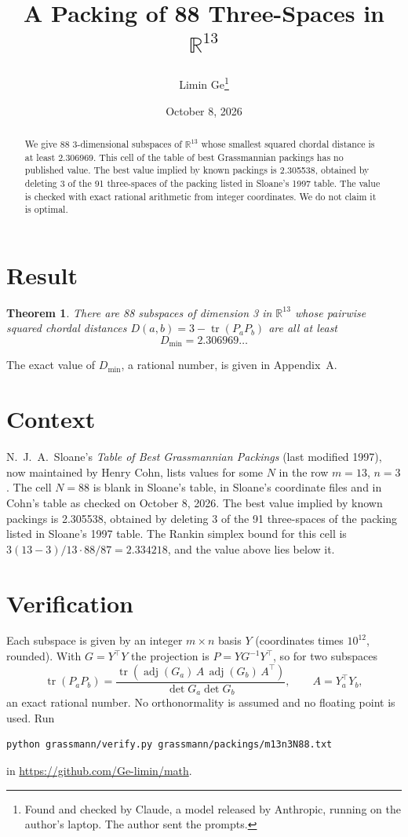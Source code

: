 \documentclass[11pt,a4paper]{article}
\title{A Packing of 88 Three-Spaces in $\mathbb{R}^{13}$}
\author{Limin Ge\thanks{Found and checked by Claude, a model released by Anthropic, running on the author's laptop. The author sent the prompts.}}
\date{October 8, 2026}
\newtheorem*{theorem}{Theorem}
\begin{document}
\maketitle
\begin{abstract}
We give 88 3-dimensional subspaces of $\mathbb{R}^{13}$ whose smallest squared chordal distance is at least 2.306969. This cell of the table of best Grassmannian packings has no published value. The best value implied by known packings is 2.305538, obtained by deleting 3 of the 91 three-spaces of the packing listed in Sloane's 1997 table. The value is checked with exact rational arithmetic from integer coordinates. We do not claim it is optimal.
\end{abstract}

\section{Result}
\begin{theorem}
There are 88 subspaces of dimension 3 in $\mathbb{R}^{13}$ whose pairwise squared chordal distances $D(a,b) = 3 - \operatorname{tr}(P_aP_b)$ are all at least
\[ D_{\min} = 2.306969\ldots \]
\end{theorem}
The exact value of $D_{\min}$, a rational number, is given in Appendix~A.


\section{Context}
N.~J.~A.~Sloane's \emph{Table of Best Grassmannian Packings} (last modified 1997), now maintained by Henry Cohn, lists values for some $N$ in the row $m=13$, $n=3$. The cell $N=88$ is blank in Sloane's table, in Sloane's coordinate files and in Cohn's table as checked on October 8, 2026. The best value implied by known packings is 2.305538, obtained by deleting 3 of the 91 three-spaces of the packing listed in Sloane's 1997 table. The Rankin simplex bound for this cell is $3(13-3)/13\cdot 88/87 = 2.334218$, and the value above lies below it.


\section{Verification}
Each subspace is given by an integer $m\times n$ basis $Y$ (coordinates times $10^{12}$, rounded). With $G=Y^\top Y$ the projection is $P=YG^{-1}Y^\top$, so for two subspaces
\[ \operatorname{tr}(P_aP_b)=\frac{\operatorname{tr}(\operatorname{adj}(G_a)\,A\,\operatorname{adj}(G_b)\,A^\top)}{\det G_a\det G_b},\qquad A=Y_a^\top Y_b, \]
an exact rational number. No orthonormality is assumed and no floating point is used. Run
\begin{verbatim}
python grassmann/verify.py grassmann/packings/m13n3N88.txt
\end{verbatim}
in \url{https://github.com/Ge-limin/math}.
\end{document}
